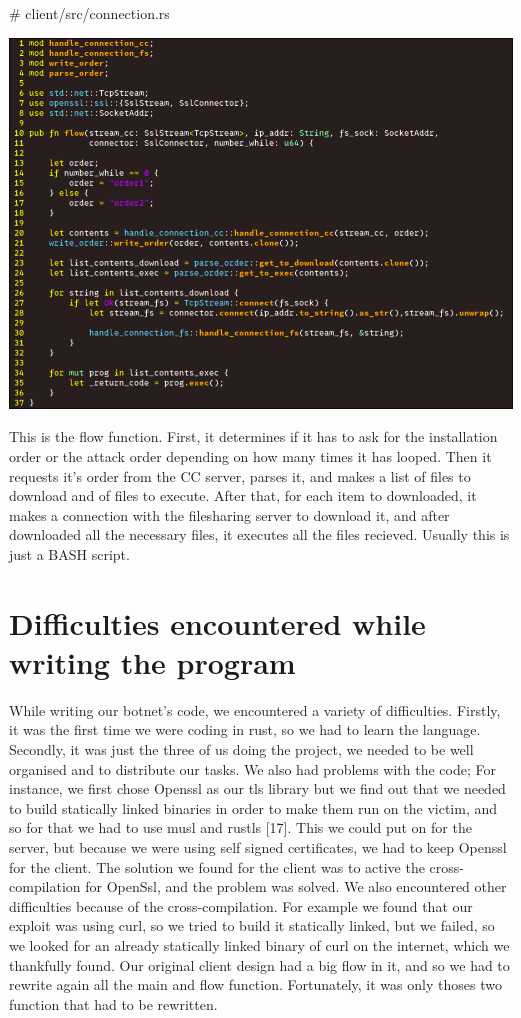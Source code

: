 \documentclass[../main.tex]{subfiles}
\begin{document}
    \# client/src/connection.rs

    \includegraphics[width=450pt]{client_flow.png}

    This is the flow function.
    First, it determines if it has to ask for the installation order or the attack order depending on how many times it has looped.
    Then it requests it's order from the CC server, parses it, and makes a list of files to download and of files to execute.
    After that, for each item to downloaded, it makes a connection with the filesharing server to download it, and after downloaded all the necessary files, it executes all the files recieved.
    Usually this is just a BASH script.


	\vspace{10pt}

	\section{Difficulties encountered while writing the program}

    While writing our botnet's code, we encountered a variety of difficulties.
    Firstly, it was the first time we were coding in rust, so we had to learn the language.
    Secondly, it was just the three of us doing the project, we needed to be well organised and to distribute our tasks.
    We also had problems with the code;
    For instance, we first chose Openssl as our tls library but we find out that we needed to build statically linked binaries in order to make them run on the victim, and so for that we had to use musl and rustls [17].
    This we could put on for the server, but because we were using self signed certificates, we had to keep Openssl for the client.
    The solution we found for the client was to active the cross-compilation for OpenSsl, and the problem was solved.
    We also encountered other difficulties because of the cross-compilation.
    For example we found that our exploit was using curl, so we tried to build it statically linked, but we failed, so we looked for an already statically linked binary of curl on the internet, which we thankfully found.
    Our original client design had a big flow in it, and so we had to rewrite again all the main and flow function.
    Fortunately, it was only thoses two function that had to be rewritten.
\end{document}
